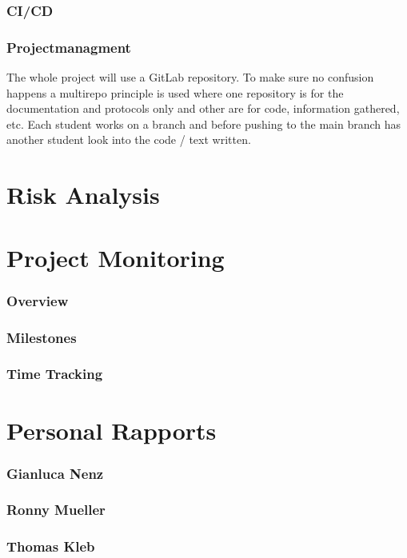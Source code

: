 \subsubsection*{CI/CD}



\subsubsection*{Projectmanagment}
The whole project will use a GitLab repository. To make sure no confusion happens a multirepo principle is used where one repository is for the documentation and protocols only and other are for code, information gathered, etc. Each student works on a branch and before pushing to the main branch has another student look into the code / text written. 
\section{Risk Analysis}


\section{Project Monitoring}

\subsubsection*{Overview}

\subsubsection*{Milestones}

\subsubsection*{Time Tracking}

\section{Personal Rapports}

\subsubsection*{Gianluca Nenz}

\subsubsection*{Ronny Mueller}

\subsubsection*{Thomas Kleb}